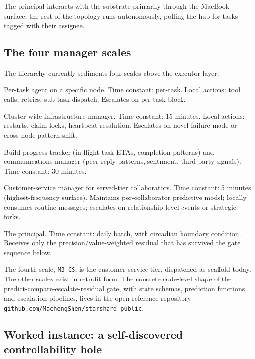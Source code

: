 \documentclass[11pt]{article}
\begin{document}
The principal interacts with the substrate primarily through the MacBook surface; the rest of the topology runs autonomously, polling the hub for tasks tagged with their assignee.

\subsection{The four manager scales}

The hierarchy currently sediments four scales above the executor layer:
\begin{description}[leftmargin=1.5em, style=nextline]
  \item[\texttt{Executor}] Per-task agent on a specific node. Time constant: per-task. Local actions: tool calls, retries, sub-task dispatch. Escalates on per-task block.
  \item[\texttt{M1-Infra}] Cluster-wide infrastructure manager. Time constant: 15 minutes. Local actions: restarts, claim-locks, heartbeat resolution. Escalates on novel failure mode or cross-node pattern shift.
  \item[\texttt{M2-Build / M2-Comms}] Build progress tracker (in-flight task ETAs, completion patterns) and communications manager (peer reply patterns, sentiment, third-party signals). Time constant: 30 minutes.
  \item[\texttt{M3-CS}] Customer-service manager for served-tier collaborators. Time constant: 5 minutes (highest-frequency surface). Maintains per-collaborator predictive model; locally consumes routine messages; escalates on relationship-level events or strategic forks.
  \item[\texttt{CEO surface}] The principal. Time constant: daily batch, with circadian boundary condition. Receives only the precision/value-weighted residual that has survived the gate sequence below.
\end{description}

The fourth scale, \texttt{M3-CS}, is the customer-service tier, dispatched as scaffold today. The other scales exist in retrofit form. The concrete code-level shape of the predict-compare-escalate-residual gate, with state schemas, prediction functions, and escalation pipelines, lives in the open reference repository \texttt{github.com/MachengShen/starshard-public}.

\subsection{Worked instance: a self-discovered controllability hole}
\end{document}
